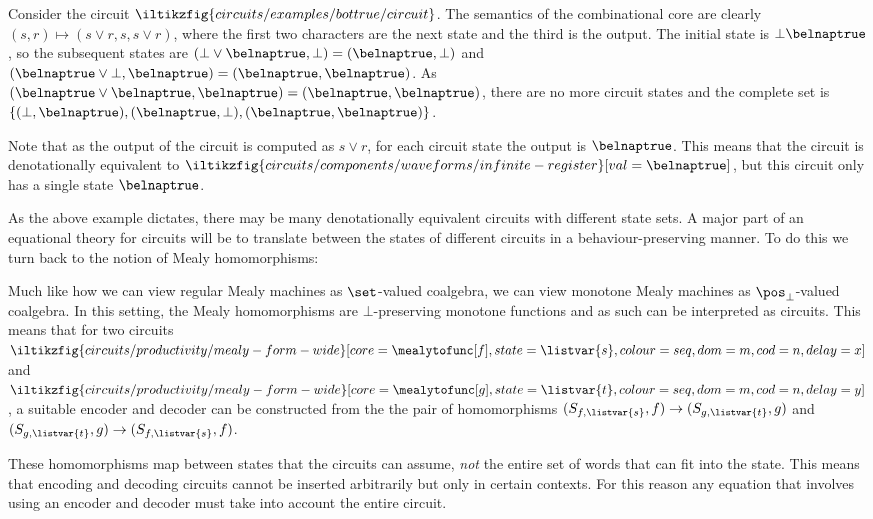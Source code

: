\documentclass{lmcs}
\begin{document}
\begin{exa}\label{ex:circuit-states}
    Consider the circuit \(
    \iltikzfig{circuits/examples/bottrue/circuit}
    \).
    The semantics of the combinational core are clearly
    \((s, r) \mapsto \left(s \lor r, s, s \lor r\right)\), where the first two characters are the
    next state and the third is the output.
    The initial state is \(\bot\belnaptrue\), so the subsequent states are
    \((\bot \lor \belnaptrue, \bot) = (\belnaptrue,\bot)\) and
    \((\belnaptrue \lor \bot, \belnaptrue) = (\belnaptrue, \belnaptrue)\).
    As \((\belnaptrue \lor \belnaptrue, \belnaptrue) = (\belnaptrue, \belnaptrue)\),
    there are no more circuit states and the complete set is
    \(\{(\bot, \belnaptrue),(\belnaptrue,\bot),(\belnaptrue,\belnaptrue)\}\).

    Note that as the output of the circuit is computed as \(s \lor r\), for each
    circuit state the output is \(\belnaptrue\).
    This means that the circuit is denotationally equivalent to \(
    \iltikzfig{circuits/components/waveforms/infinite-register}[val=\belnaptrue]
    \), but this circuit only has a single state \(\belnaptrue\).
\end{exa}

As the above example dictates, there may be many denotationally equivalent
circuits with different state sets.
A major part of an equational theory for circuits will be to translate between
the states of different circuits in a behaviour-preserving manner.
To do this we turn back to the notion of Mealy homomorphisms:

Much like how we can view regular Mealy machines as \(\set\)-valued coalgebra,
we can view monotone Mealy machines as \(\pos_\bot\)-valued coalgebra.
In this setting, the Mealy homomorphisms are \(\bot\)-preserving monotone
functions and as such can be interpreted as circuits.
This means that for two circuits \(
\iltikzfig{circuits/productivity/mealy-form-wide}[core=\mealytofunc[f],state=\listvar{s},colour=seq,dom=m,cod=n,delay=x]
\) and \(
\iltikzfig{circuits/productivity/mealy-form-wide}[core=\mealytofunc[g],state=\listvar{t},colour=seq,dom=m,cod=n,delay=y]
\), a suitable encoder and decoder can be constructed from the the pair of
homomorphisms
\((S_{f,\listvar{s}},f) \to (S_{g,\listvar{t}},g)\)
and
\((S_{g,\listvar{t}},g) \to (S_{f,\listvar{s}},f)\).

These homomorphisms map between states that the circuits
can assume, \emph{not} the entire set of words that can fit into the state.
This means that encoding and decoding circuits cannot be inserted arbitrarily
but only in certain contexts.
For this reason any equation that involves using an encoder and decoder must
take into account the entire circuit.
\end{document}
